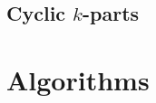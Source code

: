 \documentclass[12pt, twoside]{book}
\begin{document}
%
%
%
%
%
%
%

\section{Cyclic $k$-parts}\label{sec:cyclic-k-parts}


\chapter{Algorithms}\label{ch:algorithms}
\end{document}
